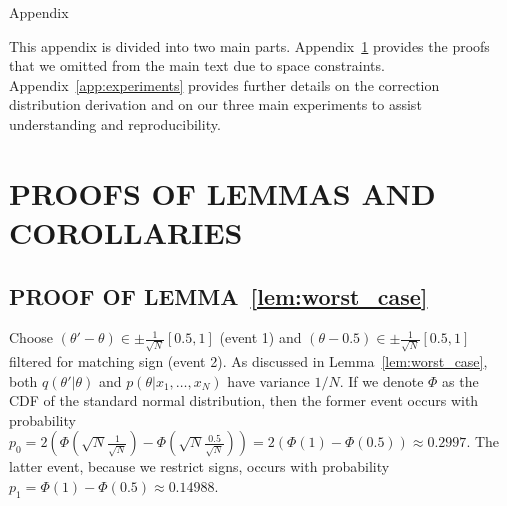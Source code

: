 \documentclass[letterpaper]{article}
\begin{document}
\newpage



\clearpage
\appendix


\onecolumn
\begin{center}
{\Large Appendix}
\end{center}

This appendix is divided into two main parts. Appendix~\ref{app:proofs} provides
the proofs that we omitted from the main text due to space constraints.
Appendix~\ref{app:experiments} provides further details on the correction
distribution derivation and on our three main experiments to assist
understanding and reproducibility. 


\section{PROOFS OF LEMMAS AND COROLLARIES}\label{app:proofs}

\subsection{PROOF OF LEMMA~\ref{lem:worst_case}}\label{app:worst_case_proof}

Choose $(\theta' - \theta) \in \pm\frac{1}{\sqrt{N}}[0.5,1]$ (event 1) and
$(\theta -0.5) \in \pm\frac{1}{\sqrt{N}}[0.5,1]$ filtered for  matching sign
(event 2).  As discussed in Lemma~\ref{lem:worst_case}, both $q(\theta' |
\theta)$ and $p(\theta | x_1,\ldots,x_N)$ have variance $1/N$. If we denote
$\Phi$ as the CDF of the standard normal distribution, then the former event
occurs with probability $p_0 = 2(\Phi(\sqrt{N}\frac{1}{\sqrt{N}}) -
\Phi(\sqrt{N}\frac{0.5}{\sqrt{N}})) = 2(\Phi(1)-\Phi(0.5)) \approx 0.2997$. The
latter event, because we restrict signs, occurs with probability $p_1 =
\Phi(1)-\Phi(0.5) \approx 0.14988$. 
\end{document}
